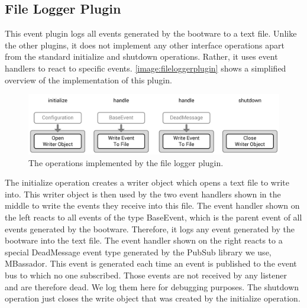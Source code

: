 \subsection{File Logger Plugin}

This event plugin logs all events generated by the bootware to a text file.
Unlike the other plugins, it does not implement any other interface operations apart from the standard initialize and shutdown operations.
Rather, it uses event handlers to react to specific events.
\autoref{image:fileloggerplugin} shows a simplified overview of the implementation of this plugin.

\begin{figure}[!htbp]
	\centering
	\includegraphics[resolution=600]{implementation/assets/filelogger_plugin}
	\caption{The operations implemented by the file logger plugin.}
	\label{image:fileloggerplugin}
\end{figure}

The initialize operation creates a writer object which opens a text file to write into.
This writer object is then used by the two event handlers shown in the middle to write the events they receive into this file.
The event handler shown on the left reacts to all events of the type BaseEvent, which is the parent event of all events generated by the bootware.
Therefore, it logs any event generated by the bootware into the text file.
The event handler shown on the right reacts to a special DeadMessage event type generated by the PubSub library we use, MBassador.
This event is generated each time an event is published to the event bus to which no one subscribed.
Those events are not received by any listener and are therefore dead.
We log them here for debugging purposes.
The shutdown operation just closes the write object that was created by the initialize operation.
